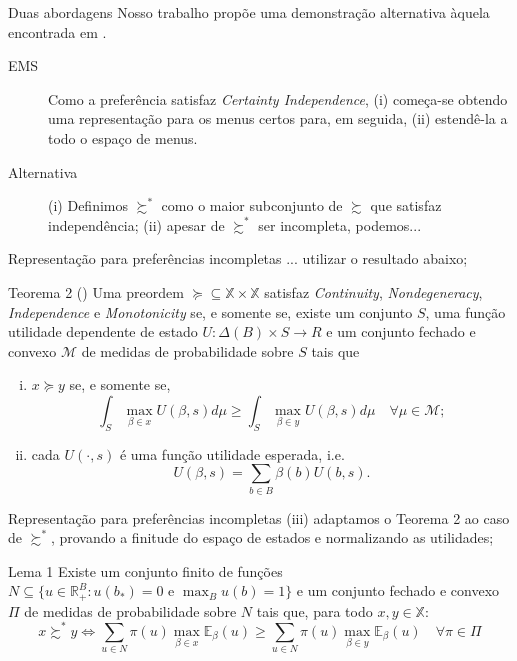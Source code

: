 \documentclass[11pt]{beamer}
\theoremstyle{nonumberplain}
\theoremstyle{plain}
\begin{document}
\begin{frame}{Duas abordagens}
Nosso trabalho propõe uma demonstração alternativa àquela encontrada em \cite{Epstein2007}.

\vspace{10pt}

\begin{description}
\item[EMS] Como a preferência satisfaz \emph{Certainty Independence}, (i) começa-se obtendo uma representação para os menus certos para, em seguida, (ii) estendê-la a todo o espaço de menus.

\pause
\vspace{10pt}

\item[Alternativa] (i) Definimos $\succsim^*$ como o maior subconjunto de $\succsim$ que satisfaz independência; (ii) apesar de $\succsim^*$ ser incompleta, podemos... 
\end{description}
\end{frame}

\begin{frame}{Representação para preferências incompletas}
... utilizar o resultado abaixo; 
\begin{block}{Teorema 2 (\cite{Kochov2007})}
Uma preordem $\succcurlyeq\subseteq\mathbb{X}\times\mathbb{X}$ satisfaz \emph{Continuity}, \emph{Nondegeneracy}, \emph{Independence} e \emph{Monotonicity} se, e somente se, existe um conjunto $S$, uma função utilidade dependente de estado $U:\Delta(B)\times S\rightarrow R$ e um conjunto fechado e convexo $\mathcal{M}$ de medidas de probabilidade sobre $S$ tais que
\begin{enumerate}[(i)]
\item $x\succcurlyeq y$ se, e somente se, $$ \int_{S} \max_{\beta\in x}U(\beta,s)d\mu \geq \int_{S} \max_{\beta\in y}U(\beta,s)d\mu\quad \forall\mu\in\mathcal{M};$$
\item cada $U(\cdot,s)$ é uma função utilidade esperada, i.e. $$U(\beta,s)=\sum_{b\in B} \beta(b)U(b,s).$$
\end{enumerate}  
\end{block}
\end{frame}

\begin{frame}{Representação para preferências incompletas}
(iii) adaptamos o Teorema 2 ao caso de $\succsim^*$,  provando a finitude do espaço de estados e normalizando as utilidades;

\begin{block}{Lema 1}
Existe um conjunto finito de funções $N\subseteq\{u \in \mathbb{R}^B_+:u(b_*)=0\text { e }\max_{B}u(b)=1\}$ e um conjunto fechado e convexo $\Pi$ de medidas de probabilidade sobre $N$ tais que, para todo $x,y\in\mathbb{X}$:
$$x\succsim^* y \Leftrightarrow \sum_{u\in N} \pi(u)\max_{\beta\in x}\mathbb{E}_\beta(u) \geq \sum_{u\in N} \pi(u)\max_{\beta\in y}\mathbb{E}_\beta(u)\quad \forall\pi\in\Pi$$
\end{block}

\end{frame}
\end{document}
